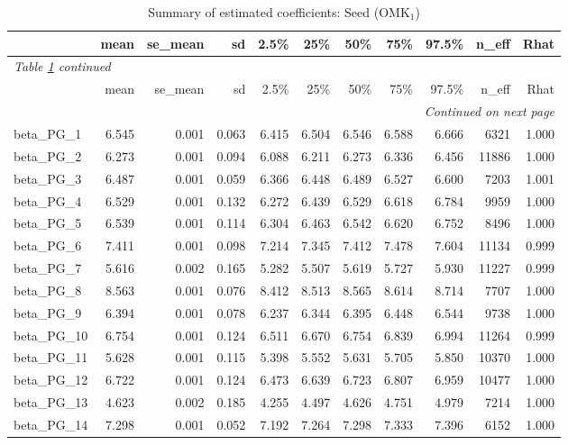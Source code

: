 \documentclass[12pt]{article}
\begin{document}
\begingroup
\footnotesize
\setlength{\tabcolsep}{3pt}
\begin{longtable}{lrrrrrrrrrr}
\caption{Summary of estimated coefficients: Seed (OMK$_\text{1}$)}
\label{tab:coef_summary_omk1} \\
\toprule
 & mean & se\_mean & sd & 2.5\% & 25\% & 50\% & 75\% & 97.5\% & n\_eff & Rhat \\
\midrule
\endfirsthead
\multicolumn{11}{l}{\textit{Table \ref{tab:coef_summary_omk1} continued}} \\
\toprule
 & mean & se\_mean & sd & 2.5\% & 25\% & 50\% & 75\% & 97.5\% & n\_eff & Rhat \\
\midrule
\endhead
\midrule
\multicolumn{11}{r}{\textit{Continued on next page}} \\
\endfoot
\bottomrule
\endlastfoot
beta\_PG\_1  & 6.545 & 0.001 & 0.063 & 6.415 & 6.504 & 6.546 & 6.588 & 6.666 & 6321 & 1.000 \\
beta\_PG\_2  & 6.273 & 0.001 & 0.094 & 6.088 & 6.211 & 6.273 & 6.336 & 6.456 & 11886 & 1.000 \\
beta\_PG\_3  & 6.487 & 0.001 & 0.059 & 6.366 & 6.448 & 6.489 & 6.527 & 6.600 & 7203 & 1.001 \\
beta\_PG\_4  & 6.529 & 0.001 & 0.132 & 6.272 & 6.439 & 6.529 & 6.618 & 6.784 & 9959 & 1.000 \\
beta\_PG\_5  & 6.539 & 0.001 & 0.114 & 6.304 & 6.463 & 6.542 & 6.620 & 6.752 & 8496 & 1.000 \\
beta\_PG\_6  & 7.411 & 0.001 & 0.098 & 7.214 & 7.345 & 7.412 & 7.478 & 7.604 & 11134 & 0.999 \\
beta\_PG\_7  & 5.616 & 0.002 & 0.165 & 5.282 & 5.507 & 5.619 & 5.727 & 5.930 & 11227 & 0.999 \\
beta\_PG\_8  & 8.563 & 0.001 & 0.076 & 8.412 & 8.513 & 8.565 & 8.614 & 8.714 & 7707 & 1.000 \\
beta\_PG\_9  & 6.394 & 0.001 & 0.078 & 6.237 & 6.344 & 6.395 & 6.448 & 6.544 & 9738 & 1.000 \\
beta\_PG\_10 & 6.754 & 0.001 & 0.124 & 6.511 & 6.670 & 6.754 & 6.839 & 6.994 & 11264 & 0.999 \\
beta\_PG\_11 & 5.628 & 0.001 & 0.115 & 5.398 & 5.552 & 5.631 & 5.705 & 5.850 & 10370 & 1.000 \\
beta\_PG\_12 & 6.722 & 0.001 & 0.124 & 6.473 & 6.639 & 6.723 & 6.807 & 6.959 & 10477 & 1.000 \\
beta\_PG\_13 & 4.623 & 0.002 & 0.185 & 4.255 & 4.497 & 4.626 & 4.751 & 4.979 & 7214 & 1.000 \\
beta\_PG\_14 & 7.298 & 0.001 & 0.052 & 7.192 & 7.264 & 7.298 & 7.333 & 7.396 & 6152 & 1.000 \\

\end{longtable}
\end{document}
